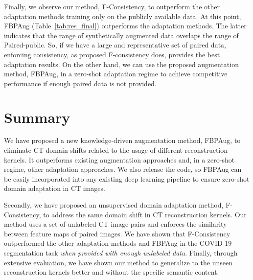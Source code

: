 Finally, we observe our method, F-Consistency, to outperform the other adaptation methods training only on the publicly available data. At this point, FBPAug (Table~\ref{tab:res_final}) outperforms the adaptation methods. The latter indicates that the range of synthetically augmented data overlaps the range of Paired-public. So, if we have a large and representative set of paired data, enforcing consistency, as proposed F-consistency does, provides the best adaptation results. On the other hand, we can use the proposed augmentation method, FBPAug, in a zero-shot adaptation regime to achieve competitive performance if enough paired data is not provided.


\section{Summary}

We have proposed a new knowledge-driven augmentation method, FBPAug, to eliminate CT domain shifts related to the usage of different reconstruction kernels. It outperforms existing augmentation approaches and, in a zero-shot regime, other adaptation approaches. We also release the code, so FBPAug can be easily incorporated into any existing deep learning pipeline to ensure zero-shot domain adaptation in CT images.

Secondly, we have proposed an unsupervised domain adaptation method, F-Consistency, to address the same domain shift in CT reconstruction kernels. Our method uses a set of unlabeled CT image pairs and enforces the similarity between feature maps of paired images. We have shown that F-Consistency outperformed the other adaptation methods and FBPAug in the COVID-19 segmentation task \textit{when provided with enough unlabeled data}. Finally, through extensive evaluation, we have shown our method to generalize to the unseen reconstruction kernels better and without the specific semantic content.


